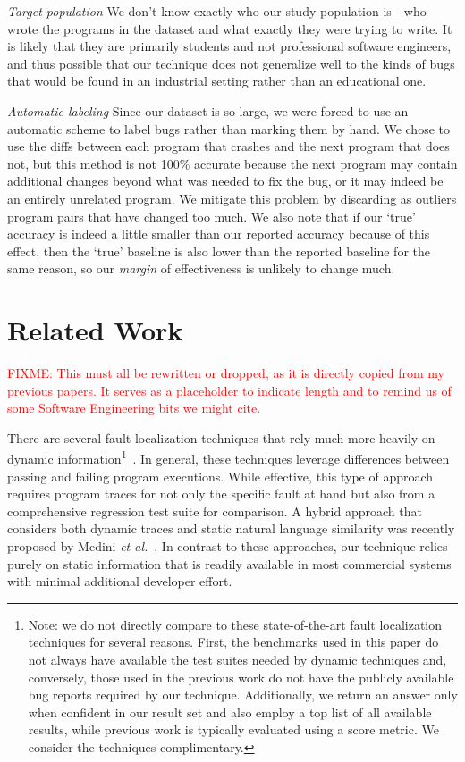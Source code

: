\documentclass[conference]{IEEEtran}
\newcommand{\fixme}[1]{\textcolor{red}{FIXME: #1}}
\begin{document}
\emph{Target population} We don't know exactly who our study population is -
who wrote the programs in the dataset and what exactly they were trying to write.
It is likely that they are primarily students and not professional software engineers,
and thus possible that our technique does not generalize well to the kinds of
bugs that would be found in an industrial setting rather than an educational one.

\emph{Automatic labeling} Since our dataset is so large, we were forced to use an automatic
scheme to label bugs rather than marking them by hand. We chose to use the diffs
between each program that crashes and the next program that does not, but this method
is not 100\% accurate because the next program may contain additional changes
beyond what was needed to fix the bug, or it may indeed be an entirely unrelated
program. We mitigate this problem by discarding as outliers program pairs that have
changed too much. We also note that if our `true' accuracy is indeed a little
smaller than our reported accuracy because of this effect, then the `true' baseline
is also lower than the reported baseline for the same reason, so our
\emph{margin} of effectiveness is unlikely to change much.

\section{Related Work}
\fixme{This must all be rewritten or dropped, as it is directly copied from
my previous papers. It serves as a placeholder to indicate length and to
remind us of some Software Engineering bits we might cite.}

There are several fault localization techniques that rely much more heavily
on dynamic information\footnote{Note: we do not directly compare to these
state-of-the-art fault localization techniques for several reasons.  First,
the benchmarks used in this paper do not always have available the test
suites needed by dynamic techniques and, conversely, those used in the
previous work do not have the publicly available bug reports required
by our technique.  Additionally, we return an answer only when confident in
our result set and also employ a top list of all available results, while
previous work is typically evaluated using a score metric.  We consider the
techniques complimentary.}~\cite
{harrold05,Renieris03,cleve05,wang09}.
In general,
these techniques leverage differences between passing and failing program
executions.  While effective, this type of approach requires program traces
for not only the specific fault at hand but also from a comprehensive regression
test suite for comparison.
A hybrid approach that considers both dynamic
traces and static natural language similarity was recently proposed by
Medini \textit{et al.}~\cite{Medini11}.
In contrast to these approaches, our technique relies purely on static
information that is readily available in most commercial systems with minimal
additional developer effort.
\end{document}
